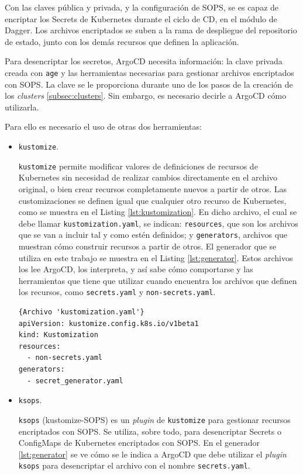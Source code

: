 Con las claves pública y privada, y la configuración de SOPS, se es capaz de encriptar los Secrets de Kubernetes durante el ciclo de CD, en el módulo de Dagger. Los archivos encriptados se suben a la rama de despliegue del repositorio de estado, junto con los demás recursos que definen la aplicación.

Para desencriptar los secretos, ArgoCD necesita información: la clave privada creada con \texttt{age} y las herramientas necesarias para gestionar archivos encriptados con SOPS. La clave se le proporciona durante uno de los pasos de la creación de los \textit{clusters} \ref{subsec:clusters}. Sin embargo, es necesario decirle a ArgoCD cómo utilizarla.

Para ello es necesario el uso de otras dos herramientas:

\begin{itemize}
  \item \texttt{kustomize}\cite{kustomize}.

    \texttt{kustomize} permite modificar valores de definiciones de recursos de Kubernetes sin necesidad de realizar cambios directamente en el archivo original, o bien crear recursos completamente nuevos a partir de otros. Las customizaciones se definen igual que cualquier otro recurso de Kubernetes, como se muestra en el Listing \ref{lst:kustomization}. En dicho archivo, el cual se debe llamar \texttt{kustomization.yaml}, se indican: \texttt{resources}, que son los archivos que se van a incluir tal y como estén definidos; y \texttt{generators}, archivos que muestran cómo construir recursos a partir de otros. El generador que se utiliza en este trabajo se muestra en el Listing \ref{lst:generator}. Estos archivos los lee ArgoCD, los interpreta, y así sabe cómo comportarse y las herramientas que tiene que utilizar cuando encuentra los archivos que definen los recursos, como \texttt{secrets.yaml} y \texttt{non-secrets.yaml}.

\begin{lstlisting}[language=helm,label=lst:kustomization]{Archivo 'kustomization.yaml'}
apiVersion: kustomize.config.k8s.io/v1beta1
kind: Kustomization
resources:
  - non-secrets.yaml
generators:
  - secret_generator.yaml
\end{lstlisting}

  \item \texttt{ksops}\cite{ksops}.

    \texttt{ksops} (kustomize-SOPS) es un \textit{plugin} de \texttt{kustomize} para gestionar recursos encriptados con SOPS. Se utiliza, sobre todo, para desencriptar Secrets o ConfigMaps de Kubernetes encriptados con SOPS. En el generador \ref{lst:generator} se ve cómo se le indica a ArgoCD que debe utilizar el \textit{plugin}  \texttt{ksops} para desencriptar el archivo con el nombre \texttt{secrets.yaml}.


\end{itemize}
